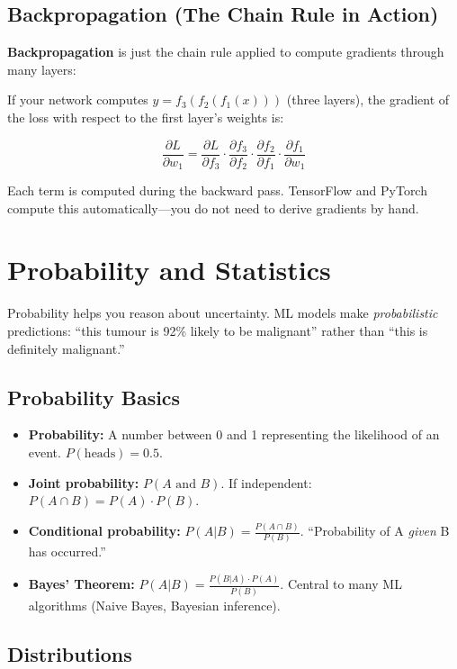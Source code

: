 \documentclass[12pt, a4paper, oneside]{book}
\begin{document}
\subsection{Backpropagation (The Chain Rule in Action)}

\textbf{Backpropagation} is just the chain rule applied to compute gradients through many layers:

If your network computes $y = f_3(f_2(f_1(x)))$ (three layers), the gradient of the loss with respect to the first layer's weights is:

$$\frac{\partial L}{\partial w_1} = \frac{\partial L}{\partial f_3} \cdot \frac{\partial f_3}{\partial f_2} \cdot \frac{\partial f_2}{\partial f_1} \cdot \frac{\partial f_1}{\partial w_1}$$

Each term is computed during the backward pass. TensorFlow and PyTorch compute this automatically---you do not need to derive gradients by hand.

\section{Probability and Statistics}

Probability helps you reason about uncertainty. ML models make \emph{probabilistic} predictions: ``this tumour is 92\% likely to be malignant'' rather than ``this is definitely malignant.''

\subsection{Probability Basics}

\begin{itemize}[leftmargin=2em]
    \item \textbf{Probability:} A number between 0 and 1 representing the likelihood of an event. $P(\text{heads}) = 0.5$.
    \item \textbf{Joint probability:} $P(A \text{ and } B)$. If independent: $P(A \cap B) = P(A) \cdot P(B)$.
    \item \textbf{Conditional probability:} $P(A | B) = \frac{P(A \cap B)}{P(B)}$. ``Probability of A \emph{given} B has occurred.''
    \item \textbf{Bayes' Theorem:} $P(A|B) = \frac{P(B|A) \cdot P(A)}{P(B)}$. Central to many ML algorithms (Naive Bayes, Bayesian inference).
\end{itemize}

\subsection{Distributions}
\end{document}
